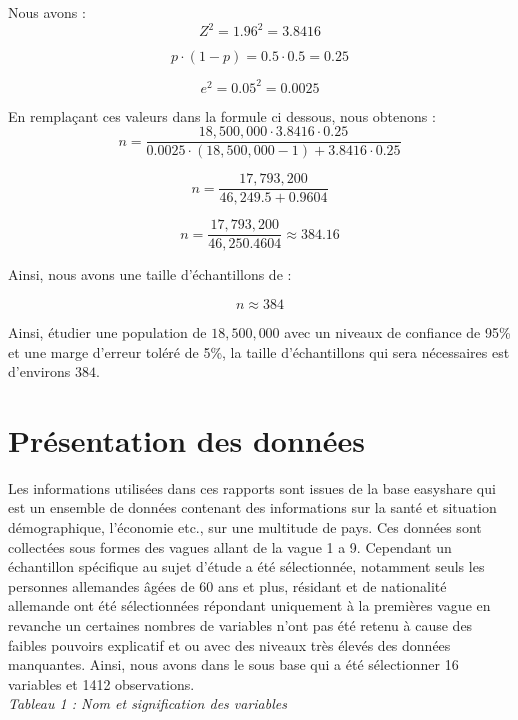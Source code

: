 \documentclass[a4paper]{article}
\begin{document}
	Nous avons :
	\[
	Z^2 = 1.96^2 = 3.8416
	\]
	
	\[
	p \cdot (1-p) = 0.5 \cdot 0.5 = 0.25
	\]
	
	\[
	e^2 = 0.05^2 = 0.0025
	\]
	
	En remplaçant ces valeurs dans la formule ci dessous, nous obtenons :
	\[
	n = \frac{18{,}500{,}000 \cdot 3.8416 \cdot 0.25}{0.0025 \cdot (18{,}500{,}000 - 1) + 3.8416 \cdot 0.25}
	\]
	
	\[
	n = \frac{17{,}793{,}200}{46{,}249.5 + 0.9604}
	\]
	
	\[
	n = \frac{17{,}793{,}200}{46{,}250.4604} \approx 384.16
	\]
	
	Ainsi, nous avons une taille d'échantillons de  :
	
	\[
	n \approx 384
	\]
	
	Ainsi, étudier une population de \( 18{,}500{,}000 \) avec un niveaux de confiance de 95\% et une marge d'erreur toléré de 5\%, la taille d'échantillons qui sera nécessaires est d'environs \( 384 \).
	
	
	
	
	\section{Présentation des données} 
	
	Les informations utilisées dans ces rapports sont issues de la base easyshare qui est un ensemble de données contenant des informations sur la santé et situation démographique, l'économie etc., sur une multitude de pays. Ces données sont collectées sous formes des vagues allant de la vague 1 a 9. Cependant un échantillon spécifique au sujet d'étude a été sélectionnée, notamment seuls les personnes allemandes âgées de 60 ans et plus, résidant et de nationalité allemande ont été sélectionnées répondant uniquement à la premières vague en revanche un certaines nombres de variables n’ont pas été retenu à cause des faibles pouvoirs explicatif et ou avec des niveaux très élevés des données manquantes. Ainsi, nous avons dans le sous base qui a été sélectionner 16 variables et 1412 observations. \\
	
	\textit{Tableau 1 : Nom et signification  des variables}
	
\end{document}
